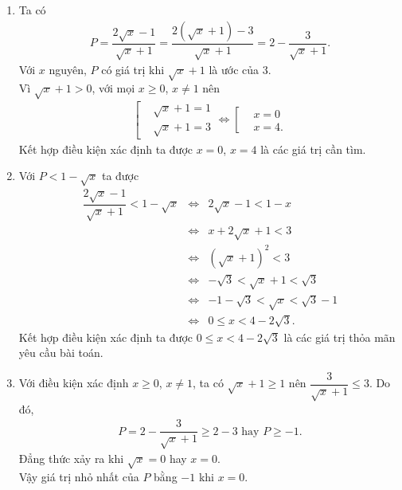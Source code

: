 \begin{bt}
{\begin{enumerate}
\begin{eqnarray*}
				&\Leftrightarrow & 4x-2\sqrt{x}=\sqrt{x}+1\\
				&\Leftrightarrow & 4x-3\sqrt{x}-1=0\\
				&\Leftrightarrow & \left[\begin{aligned}&\sqrt{x}=1 \\&\sqrt{x}=-\dfrac{1}{4} \text{ (loại)}\end{aligned}\right.\\ &\Leftrightarrow & \sqrt{x}=1\\
				&\Leftrightarrow & x=1 \text{ (không thỏa mãn điều kiện xác định)}.
			\end{eqnarray*}
			Vậy không có giá trị nào của $x$ thỏa mãn yêu cầu bài toán.
			\item Ta có
			\begin{eqnarray*}
				P = \dfrac{2\sqrt{x}-1}{\sqrt{x}+1} = \dfrac{2\left(\sqrt{x}+1\right)-3}{\sqrt{x}+1} = 2 - \dfrac{3}{\sqrt{x}+1}.
			\end{eqnarray*}
			Với $x$ nguyên, $P$ có giá trị khi $\sqrt{x}+1$ là ước của $3$.\\
			Vì $\sqrt{x}+1 > 0$, với mọi $x\geq 0$, $x \neq 1$ nên
			\allowdisplaybreaks
			\begin{eqnarray*}
				\left[\begin{aligned}&\sqrt{x}+1=1 \\&\sqrt{x}+1=3\end{aligned}\right. \Leftrightarrow \left[\begin{aligned}&x=0 \\& x=4.\end{aligned}\right.
			\end{eqnarray*}
			Kết hợp điều kiện xác định ta được $x=0$, $x=4$ là các giá trị cần tìm.
			\item Với $P < 1-\sqrt{x}$ ta được
			\allowdisplaybreaks
			\begin{eqnarray*}
				\dfrac{2\sqrt{x}-1}{\sqrt{x}+1} < 1-\sqrt{x} &\Leftrightarrow & 2\sqrt{x}-1 < 1-x\\
				&\Leftrightarrow & x+2\sqrt{x}+1 < 3\\
				&\Leftrightarrow &\left(\sqrt{x}+1\right)^2 < 3\\
				&\Leftrightarrow & -\sqrt{3} < \sqrt{x}+1 < \sqrt{3}\\
				&\Leftrightarrow & -1-\sqrt{3} <\sqrt{x}<\sqrt{3}-1\\
				&\Leftrightarrow & 0 \leq x <4-2\sqrt{3}.
			\end{eqnarray*}
			Kết hợp điều kiện xác định ta được $0 \leq x < 4-2\sqrt{3}$ là các giá trị thỏa mãn yêu cầu bài toán.
			\item Với điều kiện xác định $x \geq 0$, $x \neq 1$, ta có $\sqrt{x}+1 \geq 1$ nên $\dfrac{3}{\sqrt{x}+1} \leq 3$. Do đó,
			\allowdisplaybreaks
			\begin{eqnarray*}
				P = 2 - \dfrac{3}{\sqrt{x}+1} \geq 2 - 3  \text{ hay } P \geq -1.
			\end{eqnarray*}
			Đẳng thức xảy ra khi $\sqrt{x}=0$ hay $x=0$.\\
			Vậy giá trị nhỏ nhất của $P$ bằng $-1$ khi $x=0$.
		\end{enumerate}
	}
\end{bt}

